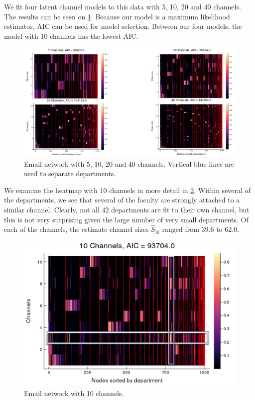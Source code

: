 \documentclass[11pt]{amsart}
\begin{document}
We fit four latent channel models to this data with 5, 10, 20 and 40 channels. 
The results can be seen on \ref{fig:emailHubs}. 
Because our model is a maximum likelihood estimator, AIC \cite{aic} can be used 
for model selection. Between our four models, the model with 10 channels has the lowest 
AIC. 

\begin{figure}
\includegraphics[width = 12cm]{emailChannels.png}
\caption{Email network with 5, 10, 20 and 40 channels. Vertical blue lines are used to separate departments.}
\label{fig:emailHubs}
\end{figure}

We examine the heatmap with 10 channels in more detail in \ref{fig:interestingHub}. 
Within several of the departments, we see that several of the faculty 
are strongly attached to a similar channel. Clearly, not all 42 departments 
are fit to their own channel, but this is not very surprising given the large number of 
very small departments. Of each of the channels, the estimate channel sizes $\hat S_{ik}$
ranged from 39.6 to 62.0. 


\begin{figure}
\includegraphics[width = 12cm]{interestingChannel.png}
\caption{Email network with 10 channels.}
\label{fig:interestingHub}
\end{figure}
\end{document}

